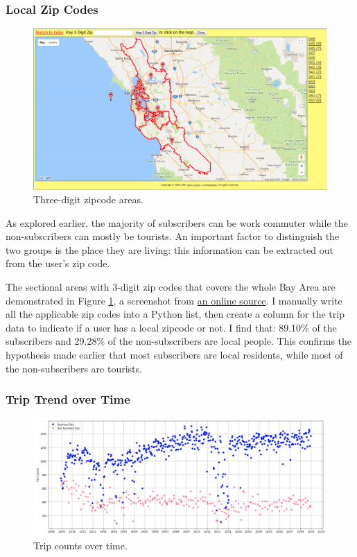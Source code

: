 \documentclass[a4paper]{article}
\begin{document}
			\subsubsection{Local Zip Codes}
			
			\begin{figure}
				\centering
				\includegraphics[width=1\textwidth]{Zipcode_Map.png}
				\caption{\label{fig:zipcode}Three-digit zipcode areas.}
			\end{figure}	
			
			As explored earlier, the majority of subscribers can be work commuter while the non-subscribers can mostly be tourists. An important factor to distinguish the two groups is the place they are living: this information can be extracted out from the user's zip code.
			
			The sectional areas with 3-digit zip codes that covers the whole Bay Area are demonstrated in Figure \ref{fig:zipcode}, a screenshot from \href{http://maps.huge.info/zip3.htm}{an online source}. I manually write all the applicable zip codes into a Python list, then create a column for the trip data to indicate if a user has a local zipcode or not. I find that: 89.10\% of the subscribers and 29.28\% of the non-subscribers are local people. This confirms the hypothesis made earlier that most subscribers are local residents, while most of the non-subscribers are tourists.

			\subsubsection{Trip Trend over Time}
			
			\begin{figure}
				\centering
				\includegraphics[width=1\textwidth]{TripTrend.png}
				\caption{\label{fig:trend}Trip counts over time.}
			\end{figure}	
			
\end{document}
